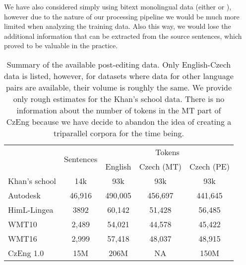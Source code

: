 We have also considered simply using bitext monolingual data (either 
or ), however due to the nature of our processing
pipeline we would be much more limited when analyzing the training data. Also this way, we would
lose the additional information that can be extracted from the source sentences, which proved to be valuable in the practice.

\begin{table*}[t]
\centering
\small

\begin{tabular}{|l|c|c|c|c|}
\hline
\multirow{2}{*}{}  &  \multirow{2}{*}{\hash{} Sentences}  &  \multicolumn{3}{c|}{\hash{} Tokens}  \\
\cline{3-5}
&   & English & Czech (MT) & Czech (PE) \\
\hline
Khan's school & \tilda{}14k & \tilda{}93k & \tilda{}93k & \tilda{}93k \\
\hline
Autodesk & 46,916 & 490,005 & 456,697 & 441,645 \\
\hline
HimL-Lingea & 3892 & 60,142 & 51,428 & 56,485 \\
\hline
WMT10 & 2,489 & 54,021 & 44,578 & 45,422 \\
\hline
WMT16 & 2,999 & 57,418 & 48,037 & 48,915 \\
\hline
CzEng 1.0 & 15M & 206M & NA & 150M \\
\hline
\end{tabular}
\caption{Summary of the available post-editing data. Only English-Czech data is listed, however, for datasets
where data for other language pairs are available, their volume is roughly the same. We provide only rough estimates for the Khan's school data.
There is no information about the number of tokens in the MT part of CzEng because we have decide to abandon the
idea of creating a triparallel corpora for the time being.
}
\label{avail-data}
\end{table*}



